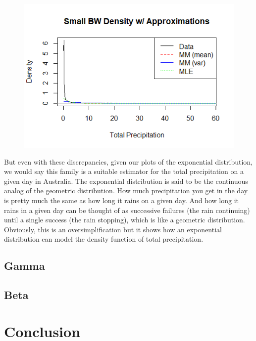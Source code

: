 \documentclass[12pt, a4paper, oneside]{report}
\begin{document}
\begin{figure}[h]
  \centering
  \includegraphics[width=0.8 \linewidth]{expDensitySmallA.png} %
\end{figure}


But even with these discrepancies, given our plots of the exponential distribution, we would say this family is a suitable estimator for the total precipitation on a given day in Australia. The exponential distribution is said to be the continuous analog of the geometric distribution. How much precipitation you get in the day is pretty much the same as how long it rains on a given day. And how long it rains in a given day can be thought of as successive failures (the rain continuing) until a single success (the rain stopping), which is like a geometric distribution. Obviously, this is an oversimplification but it shows how an exponential distribution can model the density function of total precipitation.



















\newpage
\section{Gamma}
\newpage


\section{Beta}
\newpage


\chapter{Conclusion}
\newpage
\end{document}
